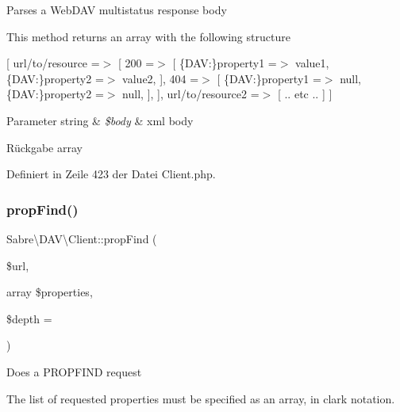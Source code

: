 Parses a Web\+D\+AV multistatus response body

This method returns an array with the following structure

\mbox{[} \textquotesingle{}url/to/resource\textquotesingle{} =$>$ \mbox{[} \textquotesingle{}200\textquotesingle{} =$>$ \mbox{[} \textquotesingle{}\{D\+AV\+:\}property1\textquotesingle{} =$>$ \textquotesingle{}value1\textquotesingle{}, \textquotesingle{}\{D\+AV\+:\}property2\textquotesingle{} =$>$ \textquotesingle{}value2\textquotesingle{}, \mbox{]}, \textquotesingle{}404\textquotesingle{} =$>$ \mbox{[} \textquotesingle{}\{D\+AV\+:\}property1\textquotesingle{} =$>$ null, \textquotesingle{}\{D\+AV\+:\}property2\textquotesingle{} =$>$ null, \mbox{]}, \mbox{]}, \textquotesingle{}url/to/resource2\textquotesingle{} =$>$ \mbox{[} .. etc .. \mbox{]} \mbox{]}


\begin{DoxyParams}[1]{Parameter}
string & {\em \$body} & xml body \\
\hline
\end{DoxyParams}
\begin{DoxyReturn}{Rückgabe}
array 
\end{DoxyReturn}


Definiert in Zeile 423 der Datei Client.\+php.

\mbox{\label{class_sabre_1_1_d_a_v_1_1_client_a9f3eff7170d762f36ba94ce6eb63912f}} 
\subsubsection{\texorpdfstring{prop\+Find()}{propFind()}}
{\footnotesize\ttfamily Sabre\textbackslash{}\+D\+A\+V\textbackslash{}\+Client\+::prop\+Find (\begin{DoxyParamCaption}\item[{}]{\$url,  }\item[{array}]{\$properties,  }\item[{}]{\$depth = {} }\end{DoxyParamCaption})}

Does a P\+R\+O\+P\+F\+I\+ND request

The list of requested properties must be specified as an array, in clark notation.

